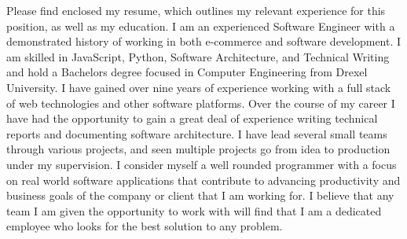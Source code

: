 \documentclass[11pt, a4paper]{awesomecv}
\begin{document}
\makecvheader

\makelettertitle

\begin{cvletter}

Please find enclosed my resume, which outlines my relevant experience for this position, as well as my education. I am an experienced Software Engineer with a demonstrated history of working in both e-commerce and software development. I am skilled in JavaScript, Python, Software Architecture, and Technical Writing and hold a Bachelor\textquotesingle s degree focused in Computer Engineering from Drexel University. I have gained over nine years of experience working with a full stack of web technologies and other software platforms. Over the course of my career I have had the opportunity to gain a great deal of experience writing technical reports and documenting software architecture. I have lead several small teams through various projects, and seen multiple projects go from idea to production under my supervision. I consider myself a well rounded programmer with a focus on real world software applications that contribute to advancing productivity and business goals of the company or client that I am working for. I believe that any team I am given the opportunity to work with will find that I am a dedicated employee who looks for the best solution to any problem.
\end{cvletter}


\makeletterclosing
\end{document}
